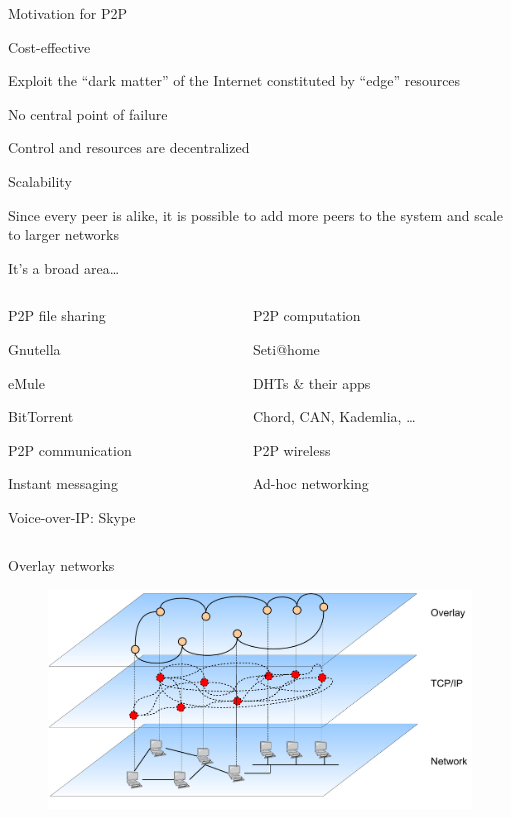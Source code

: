 \begin{frame}{Motivation for P2P}

\BIL
\item \alert{Cost-effective}
	\BI
	\item Exploit the “dark matter” of the Internet constituted by “edge” resources
	\EI
\item \alert{No central point of failure}
	\BI
	\item Control and resources are decentralized
	\EI
\item \alert{Scalability}
\BI
\item Since every peer is alike, it is possible to add more peers to the system and scale to larger networks
\EI
\EIL
\end{frame}

\begin{frame}{It's a broad area\ldots}

\begin{columns}
\begin{column}{0.5\textwidth}
\BIL
\item P2P file sharing
	\BI
	\item Gnutella
	\item eMule
	\item BitTorrent
	\EI
\item P2P communication
	\BI
	\item Instant messaging
	\item Voice-over-IP: Skype
	\EI
\EIL
\end{column}
\begin{column}{0.5\textwidth}
\BIL
\item P2P computation
	\BI
	\item Seti@home
	\EI
\item DHTs \& their apps
	\BI
	\item Chord, CAN, Kademlia, \ldots
	\EI
\item P2P wireless
	\BI
	\item Ad-hoc networking
	\EI
\EIL
\end{column}
\end{columns}

\end{frame}



\begin{frame}{Overlay networks}
\begin{figure}
	\includegraphics[width=\textwidth]{figs/10/overlay}
\end{figure}
\end{frame}

